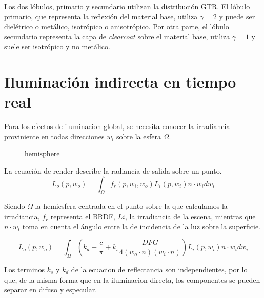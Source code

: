                 Los dos l\'obulos, primario y secundario utilizan la distribuci\'on GTR. El l\'obulo primario,
                que representa la reflexi\'on del material base, utiliza $\gamma = 2$ y puede ser diel\'etrico o met\'alico,
                isotr\'opico o anisotr\'opico. Por otra parte, el l\'obulo secundario representa la capa de \textit{clearcoat}
                sobre el material base, utiliza $\gamma = 1$ y suele ser isotr\'opico y no met\'alico.
    
    
    
    \section{Iluminaci\'on indirecta en tiempo real}
    
    Para los efectos de iluminacion global, se necesita conocer la irradiancia proviniente en todas
    direcciones $w_i$ sobre la esfera $\Omega$.\\
    
    \begin{figure}[H]
        \vspace{0.5cm}
        \centering
        \caption{hemisphere}
      \end{figure}
      \singlespacing
    
    La ecuaci\'on de render describe la radiancia de salida sobre un punto.
    \begin{equation}
    L_o(p, w_o) = \int_{\Omega} f_r(p, w_i, w_o)L_i(p, w_i)n\cdot{w_i}dw_i
    \end{equation}
    \singlespacing
    
    Siendo $\Omega$ la hemiesfera centrada en el punto sobre la que calculamos la irradiancia,
    $f_r$ representa el BRDF, $Li$, la irradiancia de la escena, mientras que $n\cdot{w_i}$ toma en
    cuenta el \'angulo entre la de incidencia de la luz sobre la superficie.
    
    \begin{equation}
    L_o(p, w_o) = \int_{\Omega} (k_d + \frac{c}{\pi} + 
    k_s \frac{DFG}{4(w_o\cdot{n})(w_i\cdot{n})})L_i(p, w_i)n\cdot{w_i}dw_i
    \end{equation}
    \singlespacing
    
    Los terminos $k_s$ y $k_d$ de la ecuacion de reflectancia son independientes, por lo que, de la
    misma forma que en la iluminacion directa, los componentes se pueden separar en difuso y
    especular.
    
